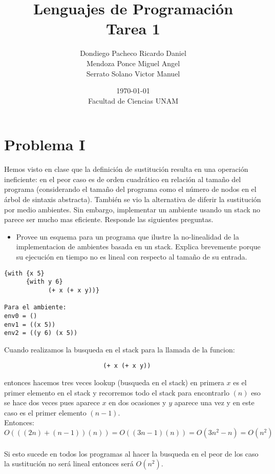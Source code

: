 \documentclass[letterpaper,11pt]{article}
\title{Lenguajes de Programación\\ Tarea 1}
\date{\today\\ Facultad de Ciencias UNAM}
\author{Dondiego Pacheco Ricardo Daniel \\
Mendoza Ponce Miguel Angel \\
Serrato Solano Victor Manuel}
\begin{document}
\maketitle

\section{Problema I}

Hemos visto en clase que la definición de sustitución resulta en una operación ineficiente: en el peor caso es de orden cuadrático en relación al tamaño del programa (considerando el tamaño del programa como el número de
nodos en el árbol de sintaxis abstracta). También se vio la alternativa de diferir la sustitución por medio ambientes. Sin embargo, implementar un ambiente usando un stack no parece ser mucho mas eficiente.
Responde las siguientes preguntas.


\begin{itemize}
\item Provee un esquema para un programa que ilustre la no-linealidad de la implementacion de ambientes basada
en un stack. Explica brevemente porque su ejecución en tiempo no es lineal con respecto al tamaño de su
entrada.
\end{itemize}

\begin{verbatim}
{with {x 5} 
      {with y 6} 
            (+ x (+ x y))}
            
Para el ambiente:
env0 = ()
env1 = ((x 5))
env2 = ((y 6) (x 5))
\end{verbatim}

Cuando realizamos la busqueda en el stack para la llamada de la funcion: 
\begin{verbatim}
                           (+ x (+ x y))
\end{verbatim}
entonces hacemos tres veces lookup (busqueda en el stack) en primera $x$ es el primer elemento en el stack y recorremos todo el stack para encontrarlo $(n)$ eso se hace dos veces pues aparece $x$ en dos ocasiones y $y$ aparece una vez y en este caso es el primer elemento $(n-1)$.\\

Entonces:\\
$O(((2n)+(n-1))(n)) = O((3n-1)(n))=O(3n^2 -n)=O(n^2)$\\
\\Si esto sucede en todos los programas al hacer la busqueda en el peor de los caso la sustitución no será lineal entonces será $O(n^2)$.\\
\end{document}
